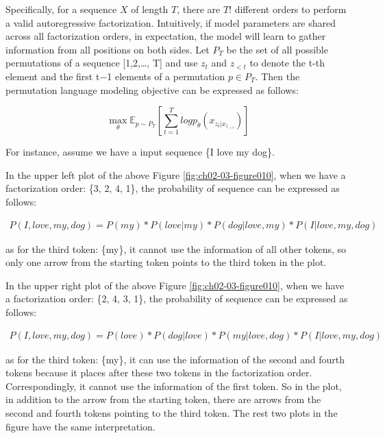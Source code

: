 \documentclass[]{krantz}
\begin{document}
Specifically, for a sequence \(X\) of length \(T\), there are \(T!\) different orders to perform a valid autoregressive factorization. Intuitively, if model parameters are shared across all factorization orders, in expectation, the model will learn to gather information from all positions on both sides. Let \(P_T\) be the set of all possible permutations of a sequence {[}1,2,\ldots{}, T{]} and use \(z_t\) and \(z_{<t}\) to denote the t-th element and the first t−1 elements of a permutation \(p\in P_T\). Then the permutation language modeling objective can be expressed as follows:

\begin{equation}
\max_{\theta} \mathbb{E}_{p\sim P_T} \left[\sum_{t=1}^Tlogp_{\theta}(x_{z_t|x_{z_{<t}}})\right]
\end{equation}

For instance, assume we have a input sequence \{I love my dog\}.

In the upper left plot of the above Figure \ref{fig:ch02-03-figure010}, when we have a factorization order: \{3, 2, 4, 1\}, the probability of sequence can be expressed as follows:

\begin{equation}
\begin{aligned}
P(I, love, my, dog) = P(my) * P(love | my) * P(dog | love, my) * P(I | love, my, dog)
\end{aligned}
\end{equation}

as for the third token: \{my\}, it cannot use the information of all other tokens, so only one arrow from the starting token points to the third token in the plot.

In the upper right plot of the above Figure \ref{fig:ch02-03-figure010}, when we have a factorization order: \{2, 4, 3, 1\}, the probability of sequence can be expressed as follows:

\begin{equation}
\begin{aligned}
P(I, love, my, dog) = P(love) * P(dog | love) * P(my | love, dog) * P(I | love, my, dog)
\end{aligned}
\end{equation}

as for the third token: \{my\}, it can use the information of the second and fourth tokens because it places after these two tokens in the factorization order. Correspondingly, it cannot use the information of the first token. So in the plot, in addition to the arrow from the starting token, there are arrows from the second and fourth tokens pointing to the third token. The rest two plots in the figure have the same interpretation.
\end{document}
